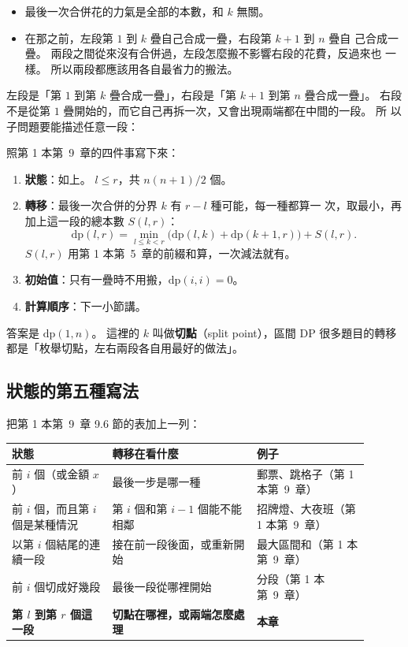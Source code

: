 \begin{itemize}
\item 最後一次合併花的力氣是全部的本數，和 $k$ 無關。
\item 在那之前，左段第 $1$ 到 $k$ 疊自己合成一疊，右段第 $k + 1$ 到 $n$ 疊自
己合成一疊。 兩段之間從來沒有合併過，左段怎麼搬不影響右段的花費，反過來也
一樣。 所以兩段都應該用各自最省力的搬法。
\end{itemize}

左段是「第 $1$ 到第 $k$ 疊合成一疊」，右段是「第 $k + 1$ 到第 $n$ 疊合成一疊」。
右段不是從第 $1$ 疊開始的，而它自己再拆一次，又會出現兩端都在中間的一段。 所
以子問題要能描述任意一段：

\begin{center}
\end{center}

照第 1 本第~9~章的四件事寫下來：

\begin{enumerate}
\item \textbf{狀態}：如上。 $l \le r$，共 $n(n + 1)/2$ 個。
\item \textbf{轉移}：最後一次合併的分界 $k$ 有 $r - l$ 種可能，每一種都算一
次，取最小，再加上這一段的總本數 $S(l, r)$：
\[
\mathrm{dp}(l, r) = \min_{l \le k < r} \bigl(\mathrm{dp}(l, k) + \mathrm{dp}(k + 1, r)\bigr) + S(l, r).
\]
$S(l, r)$ 用第 1 本第~5~章的前綴和算，一次減法就有。
\item \textbf{初始值}：只有一疊時不用搬，$\mathrm{dp}(i, i) = 0$。
\item \textbf{計算順序}：下一小節講。
\end{enumerate}

答案是 $\mathrm{dp}(1, n)$。 這裡的 $k$ 叫做\textbf{切點}（split point），區間
DP 很多題目的轉移都是「枚舉切點，左右兩段各自用最好的做法」。

\subsection{狀態的第五種寫法}
\label{sec:ivdp-shapes}

把第 1 本第~9~章 9.6 節的表加上一列：

\begin{center}
\begin{tabular}{p{0.25\linewidth}p{0.36\linewidth}p{0.29\linewidth}}
\toprule
狀態 & 轉移在看什麼 & 例子 \\
\midrule
前 $i$ 個（或金額 $x$） & 最後一步是哪一種 & 郵票、跳格子（第 1 本第~9~章） \\
前 $i$ 個，而且第 $i$ 個是某種情況 & 第 $i$ 個和第 $i - 1$ 個能不能相鄰 & 招牌燈、大夜班（第 1 本第~9~章） \\
以第 $i$ 個結尾的連續一段 & 接在前一段後面，或重新開始 & 最大區間和（第 1 本第~9~章） \\
前 $i$ 個切成好幾段 & 最後一段從哪裡開始 & 分段（第 1 本第~9~章） \\
\textbf{第 $l$ 到第 $r$ 個這一段} & \textbf{切點在哪裡，或兩端怎麼處理} & \textbf{本章} \\
\bottomrule
\end{tabular}
\end{center}

